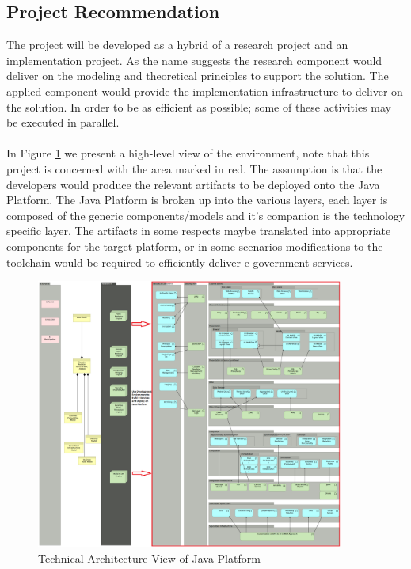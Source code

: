 \subsection{Project Recommendation}
The project will be developed as a hybrid of a research project and an implementation project. As the name suggests the research component would deliver on the modeling and theoretical principles to support the solution. The applied component would provide the implementation infrastructure to deliver on the solution. In order to be as efficient as possible; some of these activities may be executed in parallel.
\\
\\
In Figure \ref{AV} we present a high-level view of the environment, note that this project is concerned with the area marked in red. The assumption is that the developers would produce the relevant artifacts to be deployed onto the Java Platform. The Java Platform is broken up into the various layers, each layer is composed of the generic components/models and it's companion is the technology specific layer.
The artifacts in some respects maybe translated into appropriate components for the target platform, or in some scenarios modifications to the toolchain would be required to efficiently deliver e-government services.
\begin{figure}[h!]
  \caption{Technical Architecture View of Java Platform}
  \label{AV}
  \centering
    \includegraphics[width=0.9\textwidth]{images/javaplatform1.png}
\end{figure}
\clearpage


